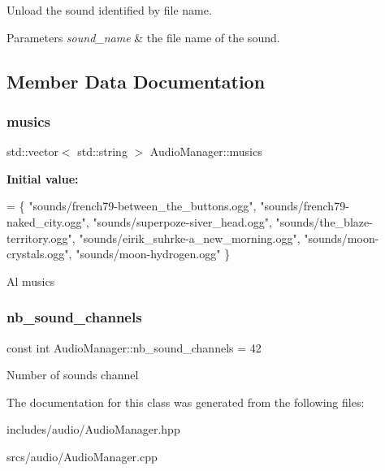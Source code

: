Unload the sound identified by file name. 


\begin{DoxyParams}{Parameters}
{\em sound\+\_\+name} & the file name of the sound. \\
\hline
\end{DoxyParams}


\subsection{Member Data Documentation}
\mbox{\label{class_audio_manager_ab4f16f2b8df28e812c60769c534644b0}} 
\subsubsection{\texorpdfstring{musics}{musics}}
{\footnotesize\ttfamily std\+::vector$<$ std\+::string $>$ Audio\+Manager\+::musics\hspace{0.3cm}{\ttfamily [static]}}

{\bfseries Initial value\+:}
\begin{DoxyCode}
= \{
    \textcolor{stringliteral}{"sounds/french79-between\_the\_buttons.ogg"},
    \textcolor{stringliteral}{"sounds/french79-naked\_city.ogg"},
    \textcolor{stringliteral}{"sounds/superpoze-siver\_head.ogg"},
    \textcolor{stringliteral}{"sounds/the\_blaze-territory.ogg"},
    \textcolor{stringliteral}{"sounds/eirik\_suhrke-a\_new\_morning.ogg"},
    \textcolor{stringliteral}{"sounds/moon-crystals.ogg"},
    \textcolor{stringliteral}{"sounds/moon-hydrogen.ogg"}
\}
\end{DoxyCode}
Al musics \mbox{\label{class_audio_manager_abd1cfb41f75592fc90007aad609a11ee}} 
\subsubsection{\texorpdfstring{nb\+\_\+sound\+\_\+channels}{nb\_sound\_channels}}
{\footnotesize\ttfamily const int Audio\+Manager\+::nb\+\_\+sound\+\_\+channels = 42\hspace{0.3cm}{\ttfamily [static]}}

Number of sounds channel 

The documentation for this class was generated from the following files\+:\begin{DoxyCompactItemize}
\item 
includes/audio/Audio\+Manager.\+hpp\item 
srcs/audio/Audio\+Manager.\+cpp\end{DoxyCompactItemize}
